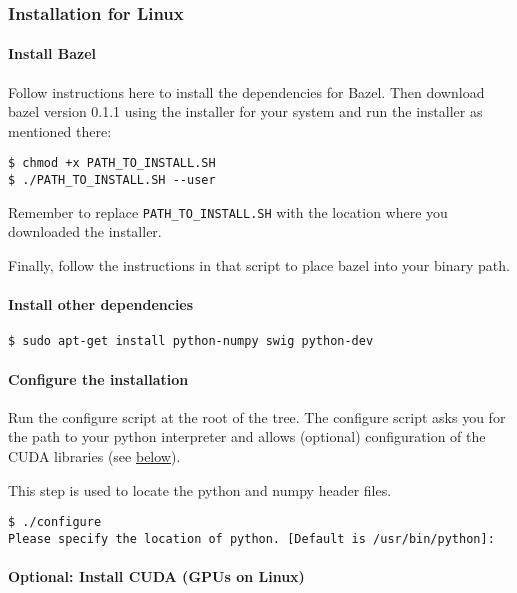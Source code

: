 \subsubsection {Installation for Linux}

\paragraph{Install Bazel}

Follow instructions here to install the dependencies for Bazel. Then download bazel version 0.1.1 using the installer for your system and run the installer as mentioned there:

\begin{lstlisting}
$ chmod +x PATH_TO_INSTALL.SH
$ ./PATH_TO_INSTALL.SH --user
\end{lstlisting}

Remember to replace \lstinline{PATH_TO_INSTALL.SH} with the location where you downloaded the installer.

Finally, follow the instructions in that script to place bazel into your binary path.

\paragraph{Install other dependencies}

\begin{lstlisting}
$ sudo apt-get install python-numpy swig python-dev
\end{lstlisting}

\paragraph{Configure the installation}

Run the configure script at the root of the tree. The configure script asks you for the path to your python interpreter and allows (optional) configuration of the CUDA libraries (see \hyperref[install_cuda]{below}).

This step is used to locate the python and numpy header files.

\begin{lstlisting}
$ ./configure
Please specify the location of python. [Default is /usr/bin/python]:
\end{lstlisting}

\paragraph{Optional: Install CUDA (GPUs on Linux)} \label{install_cuda}

